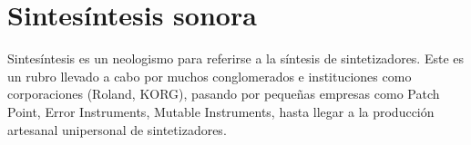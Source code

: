 \documentclass[../candidatura.tex]{subfiles}
\begin{document}
\section{Sintesíntesis sonora}

Sintesíntesis es un neologismo para referirse a la síntesis de sintetizadores. Este es un rubro llevado a cabo por muchos conglomerados e instituciones como corporaciones (Roland, KORG), pasando por pequeñas empresas como Patch Point, Error Instruments, Mutable Instruments, hasta llegar a la producción artesanal unipersonal de sintetizadores.

\newpage
\end{document}
